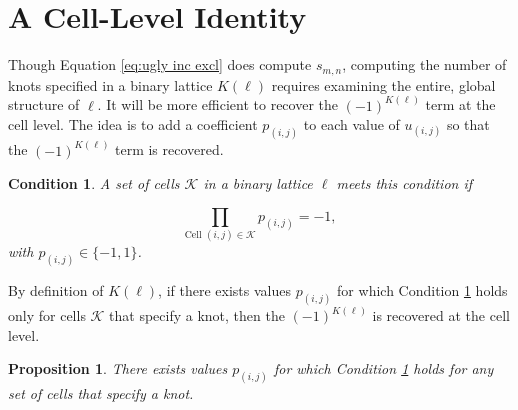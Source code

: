 \documentclass[12pt]{article}
\theoremstyle{plain}
\newtheorem{prop}[thm]{Proposition}
\newtheorem{condition}[thm]{Condition}
\theoremstyle{definition}
\theoremstyle{remark}
\theoremstyle{definition}
\begin{document}
\section{A Cell-Level Identity}

Though Equation \ref{eq:ugly inc excl} does compute $s_{m,n}$, computing the number of knots specified in a binary lattice $K(\ell)$ requires examining the entire, global structure of $\ell$. It will be more efficient to recover the $(-1)^{K(\ell)}$ term at the cell level. The idea is to add a coefficient $p_{(i,j)}$ to each value of $u_{(i,j)}$ so that the $(-1)^{K(\ell)}$ term is recovered.

\begin{condition}
    A set of cells $\mathcal{K}$ in a binary lattice $\ell$ meets this condition if
    
    \begin{equation}
        \prod_{\text{Cell } (i,j) \in \mathcal{K}} p_{(i,j)} = -1,
        \label{eq:neg prod knot condition}
    \end{equation}
    with $p_{(i,j)} \in \{-1,1\}$.
    \label{cond:neg prod condition}
\end{condition}

By definition of $K(\ell)$, if there exists values $p_{(i,j)}$ for which Condition \ref{cond:neg prod condition} holds only for cells $\mathcal{K}$ that specify a knot, then the $(-1)^{K(\ell)}$ is recovered at the cell level.

\begin{prop}
    There exists values $p_{(i,j)}$ for which Condition \ref{cond:neg prod condition} holds for any set of cells that specify a knot.
    \label{prop:neg prod prop}
\end{prop}
\end{document}
